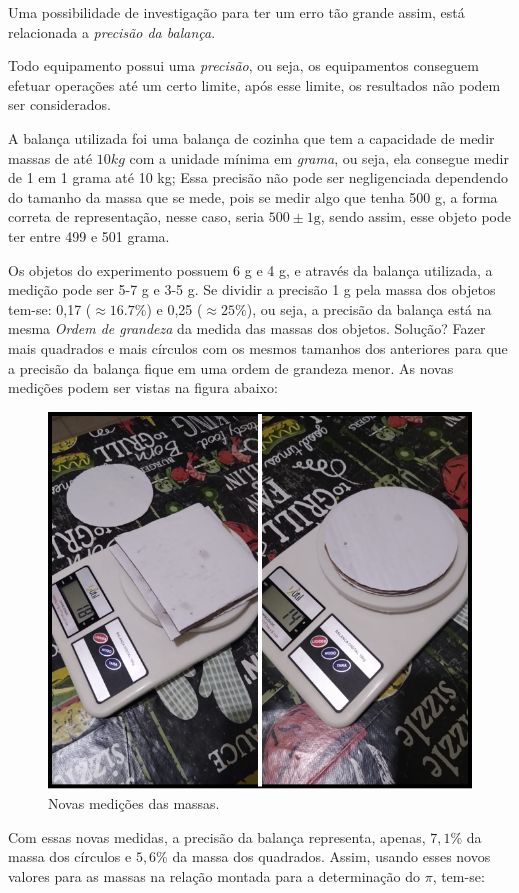 Uma possibilidade de investigação para ter um erro tão grande assim, está relacionada a \textit{precisão da balança}. 

Todo equipamento possui uma \textit{precisão}, ou seja, os equipamentos conseguem efetuar operações até um certo limite, após esse limite, os resultados não podem ser considerados.

A balança utilizada foi uma balança de cozinha que tem a capacidade de medir massas de até $10 kg$ com a unidade mínima em \textit{grama}, ou seja, ela consegue medir de 1 em 1 grama até 10 kg; Essa precisão não pode ser negligenciada dependendo do tamanho da massa que se mede, pois se medir algo que tenha 500 g, a forma correta de representação, nesse caso, seria $500 \pm 1 \text{g}$, sendo assim, esse objeto pode ter entre 499 e 501 grama. 

Os objetos do experimento possuem 6 g e 4 g, e através da balança utilizada, a medição pode ser 5-7 g e 3-5 g. Se dividir a precisão 1 g pela massa dos objetos tem-se: 0,17 ($\approx 16.7\%$) e 0,25 ($\approx 25 \%$), ou seja, a precisão da balança está na mesma \textit{Ordem de grandeza} da medida das massas dos objetos. Solução? Fazer mais quadrados e mais círculos com os mesmos tamanhos dos anteriores para que a precisão da balança fique em uma ordem de grandeza menor. As novas medições podem ser vistas na figura abaixo:

\begin{figure}[H]
	\centering
	\includegraphics[width=0.7\linewidth]{PROGRAMACAO/pic/educacao/processo_02}
	\caption[]{Novas medições das massas.}
	\label{fig:processo02}
\end{figure}

Com essas novas medidas, a precisão da balança representa, apenas, $7,1\%$ da massa dos círculos e $5,6\%$ da massa dos quadrados. Assim, usando esses novos valores para as massas na relação montada para a determinação do $\pi$, tem-se:

